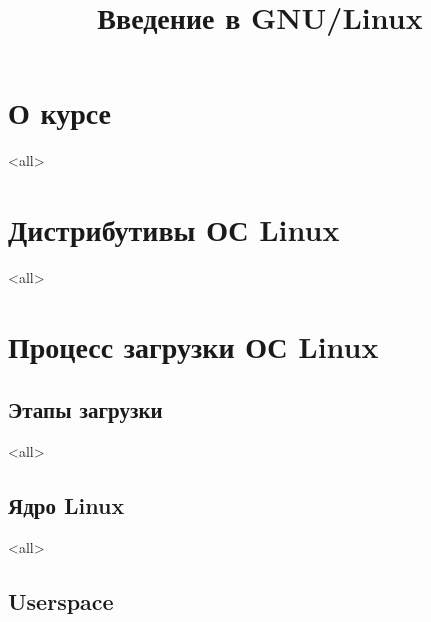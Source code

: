 

\title{Введение в GNU/Linux}





\begin{frame}
	\frametitle{}
	\titlepage
	\vspace{-0.5cm}
	\begin{center}
	\end{center}
\end{frame}


\begin{frame}
	\tableofcontents
	[hideallsubsections]
\end{frame}

\section{О курсе}

\mode<all>{}



\section{Дистрибутивы ОС Linux}

\mode<all>{}

\section{Процесс загрузки ОС Linux}

\subsection{Этапы загрузки}

\mode<all>{}

\subsection{Ядро Linux}

\mode<all>{}

\subsection{Userspace}

